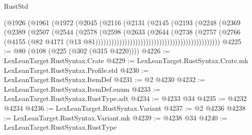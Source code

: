 \begin{lexlean}{RustStd}
\begin{coremodule}
                                                    (@1926
                                                      (@1961
                                                        (@1972
                                                          (@2045
                                                            (@2116
                                                              (@2131
                                                                (@2145
                                                                  (@2193
                                                                    (@2248
                                                                      (@2369
                                                                        (@2389
                                                                          (@2507
                                                                            (@2544
                                                                              (@2578
                                                                                (@2598
                                                                                  (@2633
                                                                                    (@2644
                                                                                      (@2738
                                                                                        (@2757
                                                                                          (@2766
                                                                                            (@4155
                                                                                              (@82
                                                                                                @4171
                                                                                                (@13
                                                                                                  @81)))))))))))))))))))))))))))))))))))))))))))))))
@4225 := @80 (@108 (@225 (@302 (@315 @4220))))
@4226 := LexLeanTarget.RustSyntax.Crate
@4229 := LexLeanTarget.RustSyntax.Crate.mk LexLeanTarget.RustSyntax.Profile.std
@4230 := LexLeanTarget.RustSyntax.ItemDef
@4231 := @2 @4230
@4232 := LexLeanTarget.RustSyntax.ItemDef.enum
@4233 := LexLeanTarget.RustSyntax.RustType.adt
@4234 := @4233 @34
@4235 := @4232 @4234
@4236 := LexLeanTarget.RustSyntax.Variant
@4237 := @2 @4236
@4238 := LexLeanTarget.RustSyntax.Variant.mk
@4239 := @4238 @34
@4240 := LexLeanTarget.RustSyntax.RustType

\end{coremodule}
\end{lexlean}
